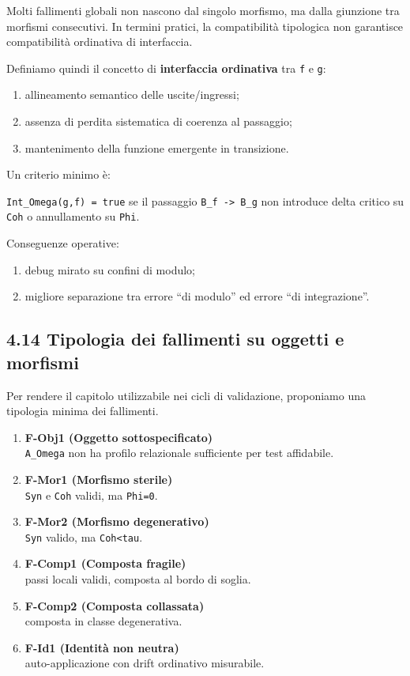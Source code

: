 Molti fallimenti globali non nascono dal singolo morfismo, ma dalla giunzione tra morfismi consecutivi. In termini pratici, la compatibilità tipologica non garantisce compatibilità ordinativa di interfaccia.

Definiamo quindi il concetto di \textbf{interfaccia ordinativa} tra \texttt{f} e \texttt{g}:

\begin{enumerate}
\def\labelenumi{\arabic{enumi}.}
\tightlist
\item
  allineamento semantico delle uscite/ingressi;
\item
  assenza di perdita sistematica di coerenza al passaggio;
\item
  mantenimento della funzione emergente in transizione.
\end{enumerate}

Un criterio minimo è:

\texttt{Int\_Omega(g,f)\ =\ true} se il passaggio \texttt{B\_f\ -\textgreater{}\ B\_g} non introduce delta critico su \texttt{Coh} o annullamento su \texttt{Phi}.

Conseguenze operative:

\begin{enumerate}
\def\labelenumi{\arabic{enumi}.}
\tightlist
\item
  debug mirato su confini di modulo;
\item
  migliore separazione tra errore ``di modulo'' ed errore ``di integrazione''.
\end{enumerate}

\subsection{4.14 Tipologia dei fallimenti su oggetti e morfismi}

Per rendere il capitolo utilizzabile nei cicli di validazione, proponiamo una tipologia minima dei fallimenti.

\begin{enumerate}
\def\labelenumi{\arabic{enumi}.}
\item
  \textbf{F-Obj1 (Oggetto sottospecificato)}\\
  \texttt{A\_Omega} non ha profilo relazionale sufficiente per test affidabile.
\item
  \textbf{F-Mor1 (Morfismo sterile)}\\
  \texttt{Syn} e \texttt{Coh} validi, ma \texttt{Phi=0}.
\item
  \textbf{F-Mor2 (Morfismo degenerativo)}\\
  \texttt{Syn} valido, ma \texttt{Coh\textless{}tau}.
\item
  \textbf{F-Comp1 (Composta fragile)}\\
  passi locali validi, composta al bordo di soglia.
\item
  \textbf{F-Comp2 (Composta collassata)}\\
  composta in classe degenerativa.
\item
  \textbf{F-Id1 (Identità non neutra)}\\
  auto-applicazione con drift ordinativo misurabile.
\end{enumerate}

